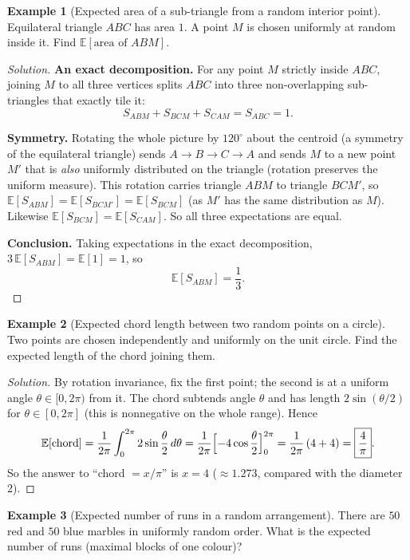 \documentclass[11pt]{article}
\theoremstyle{definition}
\newtheorem{example}{Example}[section]
\newcommand{\E}{\mathbb{E}}
\begin{document}
\begin{example}[Expected area of a sub-triangle from a random interior point]
Equilateral triangle $ABC$ has area $1$. A point $M$ is chosen uniformly at random inside it. Find $\E[\text{area of }ABM]$.
\end{example}
\begin{proof}[Solution]
\textbf{An exact decomposition.} For any point $M$ strictly inside $ABC$, joining $M$ to all three vertices splits $ABC$ into three non-overlapping sub-triangles that exactly tile it:
\[
S_{ABM}+S_{BCM}+S_{CAM}=S_{ABC}=1.
\]

\textbf{Symmetry.} Rotating the whole picture by $120^\circ$ about the centroid (a symmetry of the equilateral triangle) sends $A\to B\to C\to A$ and sends $M$ to a new point $M'$ that is \emph{also} uniformly distributed on the triangle (rotation preserves the uniform measure). This rotation carries triangle $ABM$ to triangle $BCM'$, so $\E[S_{ABM}]=\E[S_{BCM'}]=\E[S_{BCM}]$ (as $M'$ has the same distribution as $M$). Likewise $\E[S_{BCM}]=\E[S_{CAM}]$. So all three expectations are equal.

\textbf{Conclusion.} Taking expectations in the exact decomposition, $3\,\E[S_{ABM}]=\E[1]=1$, so
\[
\boxed{\E[S_{ABM}]=\frac13}.
\]
\end{proof}

\begin{example}[Expected chord length between two random points on a circle]
Two points are chosen independently and uniformly on the unit circle. Find the expected length of the chord joining them.
\end{example}

\begin{proof}[Solution]
By rotation invariance, fix the first point; the second is at a uniform angle $\theta\in[0,2\pi)$ from it. The chord subtends angle $\theta$ and has length $2\sin(\theta/2)$ for $\theta\in[0,2\pi]$ (this is nonnegative on the whole range). Hence
\[
\E[\text{chord}]=\frac1{2\pi}\int_0^{2\pi}2\sin\frac\theta2\,d\theta=\frac1{2\pi}\Bigl[-4\cos\frac\theta2\Bigr]_0^{2\pi}=\frac{1}{2\pi}\,(4+4)=\boxed{\frac4\pi}.
\]
So the answer to ``chord $=x/\pi$'' is $x=4$ ($\approx1.273$, compared with the diameter $2$).
\end{proof}

\begin{example}[Expected number of runs in a random arrangement]
There are $50$ red and $50$ blue marbles in uniformly random order. What is the expected number of runs (maximal blocks of one colour)?
\end{example}
\end{document}
